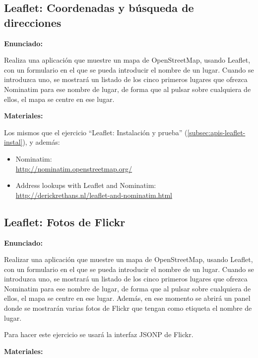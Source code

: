 \subsection{Leaflet: Coordenadas y búsqueda de direcciones}
\label{subsec:apis-leaflet-nominatim}

\textbf{Enunciado:}

Realiza una aplicación que muestre un mapa de OpenStreetMap, usando Leaflet, con un formulario en el que se pueda introducir el nombre de un lugar. Cuando se introduzca uno, se mostrará un listado de los cinco primeros lugares que ofrezca Nominatim para ese nombre de lugar, de forma que al pulsar sobre cualquiera de ellos, el mapa se centre en ese lugar.

\textbf{Materiales:}

Los mismos que el ejercicio ``Leaflet: Instalación y prueba'' (\ref{subsec:apis-leaflet-instal}), y además:

\begin{itemize}
\item Nominatim: \\
  \url{http://nominatim.openstreetmap.org/}
\item Address lookups with Leaflet and Nominatim: \\
  \url{http://derickrethans.nl/leaflet-and-nominatim.html}
\end{itemize}


\subsection{Leaflet: Fotos de Flickr}
\label{subsec:apis-leaflet-flickr}

\textbf{Enunciado:}

Realizar una aplicación que muestre un mapa de OpenStreetMap, usando Leaflet, con un formulario en el que se pueda introducir el nombre de un lugar. Cuando se introduzca uno, se mostrará un listado de los cinco primeros lugares que ofrezca Nominatim para ese nombre de lugar, de forma que al pulsar sobre cualquiera de ellos, el mapa se centre en ese lugar. Además, en ese momento se abrirá un panel donde se mostrarán varias fotos de Flickr que tengan como etiqueta el nombre de lugar.

Para hacer este ejercicio se usará la interfaz JSONP de Flickr.

\textbf{Materiales:}

